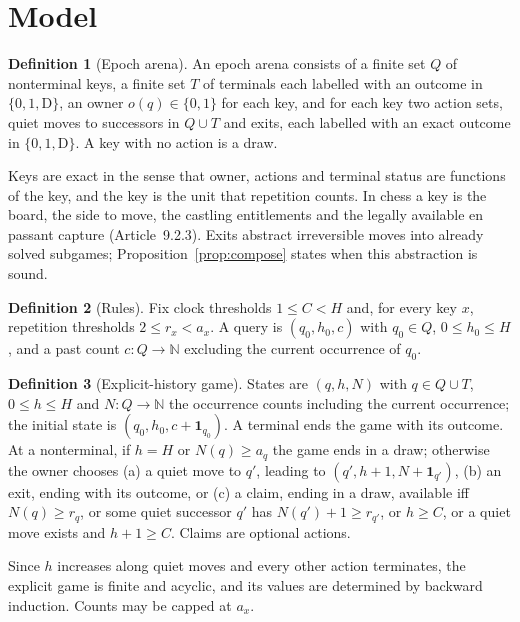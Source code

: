 \documentclass[journal]{IEEEtran}
\theoremstyle{definition}
\newtheorem{definition}{Definition}
\theoremstyle{remark}
\newcommand{\N}{\mathbb{N}}
\begin{document}
\section{Model}\label{sec:model}

\begin{definition}[Epoch arena]\label{def:arena}
An epoch arena consists of a finite set $Q$ of nonterminal keys, a finite set $T$ of terminals each labelled with an outcome in $\{0,1,\mathrm{D}\}$, an owner $o(q)\in\{0,1\}$ for each key, and for each key two action sets, quiet moves to successors in $Q\cup T$ and exits, each labelled with an exact outcome in $\{0,1,\mathrm{D}\}$. A key with no action is a draw.
\end{definition}

Keys are exact in the sense that owner, actions and terminal status are functions of the key, and the key is the unit that repetition counts. In chess a key is the board, the side to move, the castling entitlements and the legally available en passant capture (Article~9.2.3). Exits abstract irreversible moves into already solved subgames; Proposition~\ref{prop:compose} states when this abstraction is sound.

\begin{definition}[Rules]
Fix clock thresholds $1\le C<H$ and, for every key $x$, repetition thresholds $2\le r_x<a_x$. A query is $(q_0,h_0,c)$ with $q_0\in Q$, $0\le h_0\le H$, and a past count $c:Q\to\N$ excluding the current occurrence of $q_0$.
\end{definition}

\begin{definition}[Explicit-history game]\label{def:explicit}
States are $(q,h,N)$ with $q\in Q\cup T$, $0\le h\le H$ and $N:Q\to\N$ the occurrence counts including the current occurrence; the initial state is $(q_0,h_0,c+\mathbf 1_{q_0})$. A terminal ends the game with its outcome. At a nonterminal, if $h=H$ or $N(q)\ge a_q$ the game ends in a draw; otherwise the owner chooses (a) a quiet move to $q'$, leading to $(q',h+1,N+\mathbf 1_{q'})$, (b) an exit, ending with its outcome, or (c) a claim, ending in a draw, available iff $N(q)\ge r_q$, or some quiet successor $q'$ has $N(q')+1\ge r_{q'}$, or $h\ge C$, or a quiet move exists and $h+1\ge C$. Claims are optional actions.
\end{definition}

Since $h$ increases along quiet moves and every other action terminates, the explicit game is finite and acyclic, and its values are determined by backward induction. Counts may be capped at $a_x$.
\end{document}
